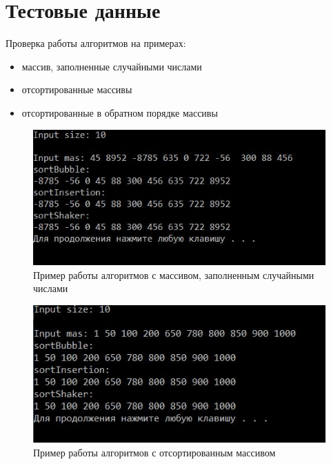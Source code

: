 \documentclass[12pt]{report}
\begin{document}
\section{Тестовые данные}

Проверка работы алгоритмов на примерах:
\begin{itemize}
	\item массив, заполненные случайными числами
	\item отсортированные массивы
	\item отсортированные в обратном порядке массивы
\end{itemize}

\begin{figure}[!htbp]
\centering
\includegraphics[width=1\linewidth]{example1.jpg}
\caption{Пример работы алгоритмов с массивом, заполненным случайными числами}
\label{fig:mpr}
\end{figure}

\begin{figure}[!htbp]
\centering
\includegraphics[width=1\linewidth]{example2.jpg}
\caption{Пример работы алгоритмов с отсортированным массивом}
\label{fig:mpr}
\end{figure}
\end{document}

